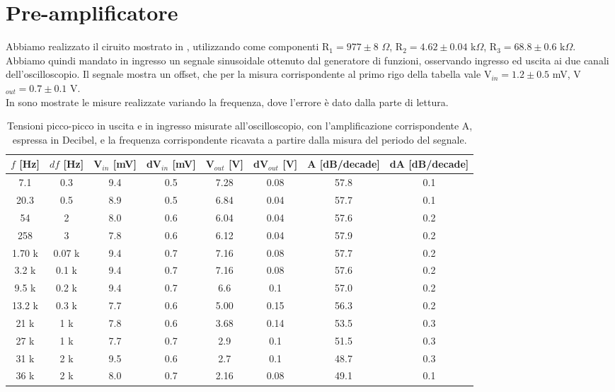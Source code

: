 \section{Pre-amplificatore}
Abbiamo realizzato il ciruito mostrato in , utilizzando come componenti R$_1 = 977 \pm 8$ $\Omega$, R$_2 = 4.62 \pm 0.04$ k$\Omega$, R$_3 = 68.8 \pm 0.6$ k$\Omega$. Abbiamo quindi mandato in ingresso un segnale sinusoidale ottenuto dal generatore di funzioni, osservando ingresso ed uscita ai due canali dell'oscilloscopio. Il segnale mostra un offset, che per la misura corrispondente al primo rigo della tabella vale V$_{in} = 1.2 \pm 0.5$ mV, V$_{out} = 0.7 \pm 0.1$ V.\\ In  sono mostrate le misure realizzate variando la frequenza, dove l'errore è dato dalla parte di lettura.\\
\begin{table}[h]
	\centering
	\begin{tabular}{cccccccc}		
		 {$f$ [Hz]}& {$df$ [Hz]}& {V$_{in}$ [mV]} & {dV$_{in}$ [mV]} & {V$_{out}$ [V]} & {dV$_{out}$ [V]} & {A [dB/decade]} & {dA [dB/decade]}\\
		 \midrule
                       7.1 & 0.3 & 9.4 & 0.5 & 7.28 & 0.08 & 57.8 & 0.1\\
                       20.3 & 0.5 & 8.9 & 0.5 & 6.84 & 0.04 & 57.7 & 0.1\\
                       54 & 2 & 8.0 & 0.6 & 6.04 & 0.04 & 57.6 & 0.2\\ 
                       258 & 3 & 7.8 & 0.6 & 6.12 & 0.04 & 57.9 & 0.2\\
                       1.70 k& 0.07 k& 9.4 & 0.7 & 7.16 & 0.08 & 57.7 & 0.2\\
                       3.2 k& 0.1 k& 9.4 & 0.7 & 7.16 & 0.08 & 57.6 & 0.2\\
                       9.5 k& 0.2 k& 9.4 & 0.7 & 6.6 & 0.1 & 57.0 & 0.2\\ 
                       13.2 k& 0.3 k& 7.7 & 0.6 & 5.00 & 0.15 & 56.3 & 0.2\\
                       21 k& 1 k& 7.8 & 0.6 & 3.68 & 0.14 & 53.5 & 0.3\\
                       27 k& 1 k& 7.7 & 0.7 & 2.9 & 0.1 & 51.5 & 0.3\\
                       31 k& 2 k& 9.5 & 0.6 & 2.7 & 0.1 & 48.7 & 0.3\\
                       36 k& 2 k& 8.0 & 0.7 & 2.16 & 0.08 & 49.1 & 0.1\\
 	\end{tabular}
	\caption{ Tensioni picco-picco in uscita e in ingresso misurate all'oscilloscopio, con l'amplificazione corrispondente A, espressa in Decibel, e la frequenza corrispondente ricavata a partire dalla misura del periodo del segnale.}
	\label{t:pre-amp}
\end{table}
